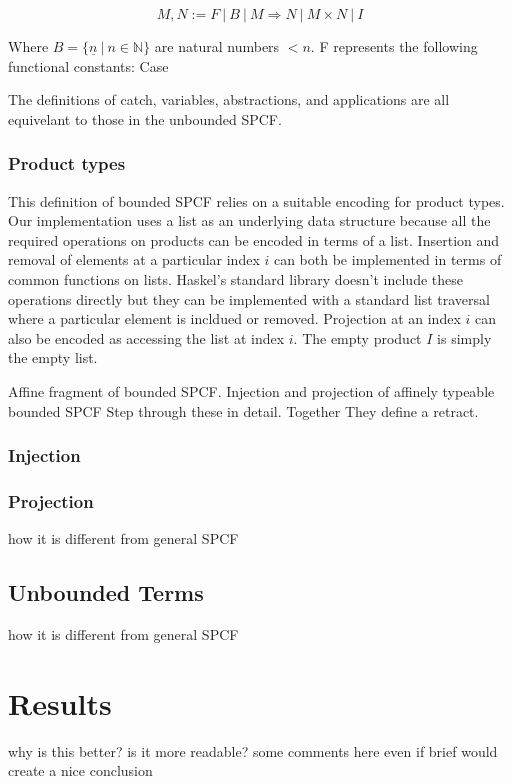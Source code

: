 \documentclass[12pt,a4paper]{report}
\theoremstyle{definition}
\theoremstyle{remark}
\begin{document}
\begin{equation}
    M,N := F\ |\ B\ |\ M \Rightarrow N\ |\ M \times N\ |\ I 
\end{equation}

Where $B = \{\underline{n}\ |\ n\in \mathbb{N}\}$ are natural numbers $ < n$.
F represents the following functional constants:
Case

The definitions of catch, variables, abstractions, and applications are all equivelant to those in the unbounded SPCF.

\subsection{Product types}
This definition of bounded SPCF relies on a suitable encoding for product types. Our implementation uses a list as an underlying data structure because all the required operations on products can be encoded in terms of a list. Insertion and removal of elements at a particular index $i$ can both be implemented in terms of common functions on lists. Haskel's standard library doesn't include these operations directly but they can be implemented with a standard list traversal where a particular element is incldued or removed. Projection at an index $i$ can also be encoded as accessing the list at index $i$. The empty product $I$ is simply the empty list.

Affine fragment of bounded SPCF.
Injection and projection of affinely typeable bounded SPCF
Step through these in detail. Together They define a retract. 
\subsection{Injection}



\subsection{Projection}

how it is different from general SPCF
\section{Unbounded Terms}
how it is different from general SPCF

\chapter{Results}
why is this better?
is it more readable?
some comments here even if brief would create a nice conclusion
\end{document}
